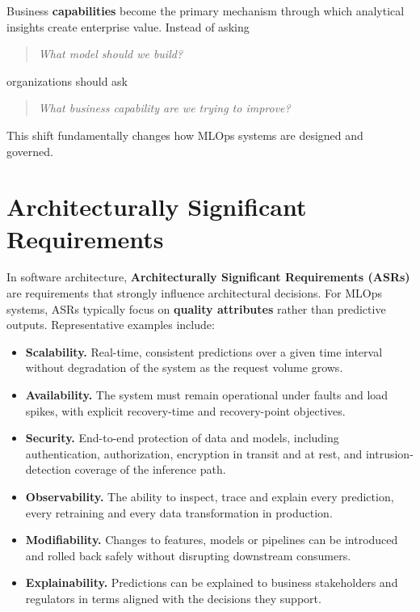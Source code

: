 \documentclass[
  a4paper,
  DIV=11,
  numbers=noendperiod]{scrartcl}
\providecommand{\tightlist}{%
  \setlength{\itemsep}{0pt}\setlength{\parskip}{0pt}}
\begin{document}
Business \textbf{capabilities} become the primary mechanism through
which analytical insights create enterprise value. Instead of asking

\begin{quote}
\emph{What model should we build?}
\end{quote}

organizations should ask

\begin{quote}
\emph{What business capability are we trying to improve?}
\end{quote}

This shift fundamentally changes how MLOps systems are designed and
governed.

\section{Architecturally Significant
Requirements}\label{architecturally-significant-requirements}

In software architecture, \textbf{Architecturally Significant
Requirements (ASRs)} are requirements that strongly influence
architectural decisions. For MLOps systems, ASRs typically focus on
\textbf{quality attributes} rather than predictive outputs.
Representative examples include:

\begin{itemize}
\tightlist
\item
  \textbf{Scalability.} Real-time, consistent predictions over a given
  time interval without degradation of the system as the request volume
  grows.
\item
  \textbf{Availability.} The system must remain operational under faults
  and load spikes, with explicit recovery-time and recovery-point
  objectives.
\item
  \textbf{Security.} End-to-end protection of data and models, including
  authentication, authorization, encryption in transit and at rest, and
  intrusion-detection coverage of the inference path.
\item
  \textbf{Observability.} The ability to inspect, trace and explain
  every prediction, every retraining and every data transformation in
  production.
\item
  \textbf{Modifiability.} Changes to features, models or pipelines can
  be introduced and rolled back safely without disrupting downstream
  consumers.
\item
  \textbf{Explainability.} Predictions can be explained to business
  stakeholders and regulators in terms aligned with the decisions they
  support.
\end{itemize}
\end{document}

